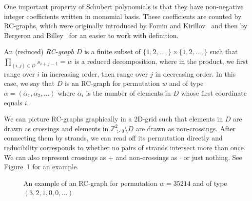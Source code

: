 \documentclass[10pt]{amsart}
\newcommand{\Z}{\mathbb{Z}}
\begin{document}
One important property of Schubert polynomials is that they have non-negative integer coefficients written in monomial basis. These coefficients are counted by RC-graphs, which were originally introduced by Fomin and Kirillov~\cite{fomin1993yang} and then by Bergeron and Billey~\cite{bergeron1993rc} for an easier to work with definition.
\begin{defi}[RC-Graphs]
An (reduced) \emph{RC-graph} $D$ is a finite subset of $\{1,2,\ldots,\}\times\{1,2,\ldots,\}$ such that $\prod_{(i,j)\in D}s_{i+j-1}=w$ is a reduced decomposition, where in the product, we first range over $i$ in increasing order, then range over $j$ in decreasing order. In this case, we say that $D$ is an RC-graph for permutation $w$ and of type $\alpha=(\alpha_1,\alpha_2,\ldots)$ where $\alpha_i$ is the number of elements in $D$ whose first coordinate equals $i$. 
\end{defi}
We can picture RC-graphs graphically in a 2D-grid such that elements in $D$ are drawn as crossings and elements in $\Z_{>0}^2\setminus D$ are drawn as non-crossings. After connecting them by strands, we can read off its permutation directly and reducibility corresponds to whether no pairs of strands intersect more than once. We can also represent crossings as $+$ and non-crossings as $\cdot$ or just nothing. See Figure~\ref{fig:rcex} for an example.
\begin{figure}[h!]
\centering
{}
\caption{An example of an RC-graph for permutation $w=35214$ and of type $(3,2,1,0,0,\ldots)$}
\label{fig:rcex}
\end{figure}
\end{document}
